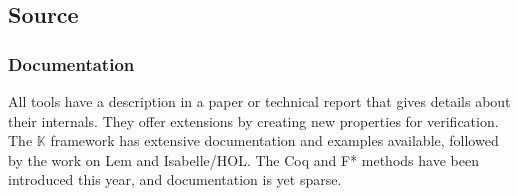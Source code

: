 
\subsection{Source} 
\subsubsection{Documentation}
All tools have a description in a paper or technical report that gives details about their internals. They offer extensions by creating new properties for verification.
The $\mathbb{K}$ framework has extensive documentation and examples available, followed by the work on Lem and Isabelle/HOL. The Coq and F* methods have been introduced this year, and documentation is yet sparse.

